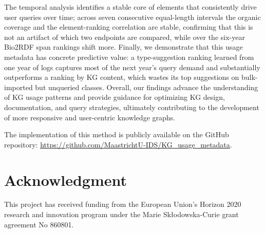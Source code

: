 \documentclass[sw]{iosart2x}
\begin{document}
The temporal analysis identifies a stable core of elements that consistently drive user queries over time; across seven consecutive equal-length intervals the organic coverage and the element-ranking correlation are stable, confirming that this is not an artifact of which two endpoints are compared, while over the six-year Bio2RDF span rankings shift more. Finally, we demonstrate that this usage metadata has concrete predictive value: a type-suggestion ranking learned from one year of logs captures most of the next year's query demand and substantially outperforms a ranking by KG content, which wastes its top suggestions on bulk-imported but unqueried classes.
Overall, our findings advance the understanding of KG usage patterns and provide guidance for optimizing KG design, documentation, and query strategies, ultimately contributing to the development of more responsive and user-centric knowledge graphs.

The implementation of this method is publicly available on the GitHub repository: \url{https://github.com/MaastrichtU-IDS/KG_usage_metadata}.
\section{Acknowledgment}\label{s7}
This project has received funding from the European Union’s Horizon 2020 research and innovation program under the Marie Skłodowska-Curie grant agreement No 860801.





\end{document}
